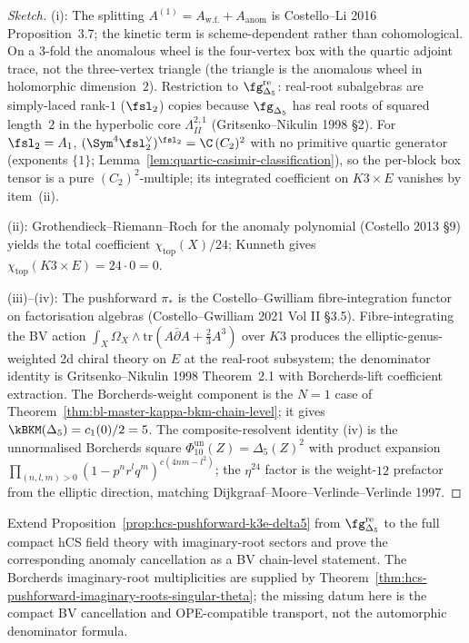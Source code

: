 \begin{proof}[Sketch]
(i): The splitting $A^{(1)} = A_{\mathrm{w.f.}} + A_{\mathrm{anom}}$ is Costello--Li 2016 Proposition~3.7; the kinetic term is scheme-dependent rather than cohomological. On a $3$-fold the anomalous wheel is the four-vertex box with the quartic adjoint trace, not the three-vertex triangle (the triangle is the anomalous wheel in holomorphic dimension~$2$). Restriction to $\fg_{\Delta_5}^{\mathrm{re}}$: real-root subalgebras are simply-laced rank-$1$ ($\fsl_2$) copies because $\fg_{\Delta_5}$ has real roots of squared length~$2$ in the hyperbolic core $\Lambda^{2,1}_{II}$ (Gritsenko--Nikulin 1998 §2). For $\fsl_2 = A_1$, $(\Sym^4 \fsl_2^\vee)^{\fsl_2} = \C\,(C_2)^2$ with no primitive quartic generator (exponents $\{1\}$; Lemma~\ref{lem:quartic-casimir-classification}), so the per-block box tensor is a pure $(C_2)^2$-multiple; its integrated coefficient on $K3 \times E$ vanishes by item~(ii).

(ii): Grothendieck--Riemann--Roch for the anomaly polynomial (Costello 2013 §9) yields the total coefficient $\chi_{\mathrm{top}}(X)/24$; Kunneth gives $\chi_{\mathrm{top}}(K3 \times E) = 24 \cdot 0 = 0$.

(iii)--(iv): The pushforward $\pi_*$ is the Costello--Gwilliam fibre-integration functor on factorisation algebras (Costello--Gwilliam 2021 Vol II §3.5). Fibre-integrating the BV action $\int_X \Omega_X \wedge \mathrm{tr}(A \bar\partial A + \tfrac23 A^3)$ over $K3$ produces the elliptic-genus-weighted 2d chiral theory on $E$ at the real-root subsystem; the denominator identity is Gritsenko--Nikulin 1998 Theorem~2.1 with Borcherds-lift coefficient extraction. The Borcherds-weight component is the $N=1$ case of Theorem~\ref{thm:bl-master-kappa-bkm-chain-level}; it gives $\kBKM(\Delta_5)=c_1(0)/2=5$. The composite-resolvent identity (iv) is the unnormalised Borcherds square $\Phi_{10}^{\mathrm{un}}(Z)=\Delta_5(Z)^2$ with product expansion $\prod_{(n,l,m) > 0}(1 - p^n r^l q^m)^{c(4nm - l^2)}$; the $\eta^{24}$ factor is the weight-$12$ prefactor from the elliptic direction, matching Dijkgraaf--Moore--Verlinde--Verlinde 1997.
\end{proof}

\begin{problem}
\label{op:hcs-pushforward-k3e-delta5-compact-bv}
Extend Proposition~\ref{prop:hcs-pushforward-k3e-delta5} from
\(\fg_{\Delta_5}^{\mathrm{re}}\) to the full compact hCS field theory
with imaginary-root sectors and prove the corresponding anomaly
cancellation as a BV chain-level statement. The Borcherds imaginary-root
multiplicities are supplied by
Theorem~\ref{thm:hcs-pushforward-imaginary-roots-singular-theta}; the
missing datum here is the compact BV cancellation and OPE-compatible
transport, not the automorphic denominator formula.
\end{problem}

